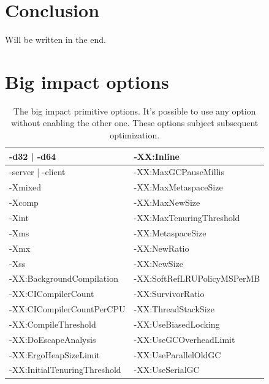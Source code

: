 \documentclass[
  digital, %
  oneside,
  notable, %
  nolof,     %
  nolot     %
]{fithesis3}
\begin{document}
\clearpage
\chapter{Conclusion}
Will be written in the end.

\clearpage



\appendix
\chapter{Big impact options}
\begin{table}[]
	\centering
	\begin{tabular}{|l|l|}
		\hline
		-d32 | -d64                   & -XX:Inline                  \\ \hline
		-server | -client             & -XX:MaxGCPauseMillis        \\ \hline
		-Xmixed                       & -XX:MaxMetaspaceSize        \\ \hline
		-Xcomp                        & -XX:MaxNewSize              \\ \hline
		-Xint                         & -XX:MaxTenuringThreshold    \\ \hline
		-Xms						  & -XX:MetaspaceSize           \\ \hline
		-Xmx						  & -XX:NewRatio                \\ \hline
		-Xss						  & -XX:NewSize                 \\ \hline
		-XX:BackgroundCompilation     & -XX:SoftRefLRUPolicyMSPerMB \\ \hline
		-XX:CICompilerCount           & -XX:SurvivorRatio           \\ \hline
		-XX:CICompilerCountPerCPU     & -XX:ThreadStackSize         \\ \hline
		-XX:CompileThreshold          & -XX:UseBiasedLocking        \\ \hline
		-XX:DoEscapeAnalysis          & -XX:UseGCOverheadLimit      \\ \hline
		-XX:ErgoHeapSizeLimit         & -XX:UseParallelOldGC        \\ \hline
		-XX:InitialTenuringThreshold  & -XX:UseSerialGC             \\ \hline
	\end{tabular}
	\caption{The big impact primitive options. It's possible to use any option without enabling the other one. These options subject subsequent optimization.}
	\label{bigimpactprimitive}
\end{table}
	
\end{document}
